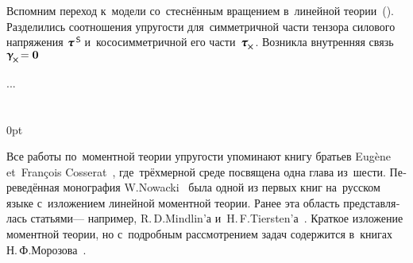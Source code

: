 

\label{section:caseoflatenttrihedron.largedisplacementsandrotations}

\begin{otherlanguage}{russian}

Вспомним переход к~модели со~стеснённым вращением в~линейной теории~().
Разделились соотношения упругости для~симметричной части тензора силового напряжения ${\forcestresstensor^{\hspace{.32ex}\mathsf{S}}}\hspace{-0.2ex}$ и~кососимметричной его части~${\forcestresstensor_{\hspace{-0.1ex}\Xcompanion}}$.
Возникла внутренняя связь~${\distortiontensor_{\hspace{-0.25ex}\Xcompanion} \hspace{-0.32ex} = \zerovector}$

...




\end{otherlanguage}

\section*{\small \wordforbibliography}

\begin{changemargin}{\parindent}{0pt}
\fontsize{10}{12}\selectfont

\begin{otherlanguage}{russian}

Все работы по~моментной теории упругости упоминают книгу братьев Eugène et~François Cosserat~\cite{cosserat}, где~трёх\-мерной среде посвящена одна глава из~шести.
Переведённая монография \hbox{W\hspace{-0.2ex}.\:Nowacki}~\cite{nowacki-elasticity} была одной из первых книг на~русском языке с~изложением линейной моментной теории.
Ранее эта область представлялась статьями\:--- например, R.\,D.\:Mindlin’а и~H.\,F.\:Tiersten’а~\cite{mindlin.tiersten}.
Краткое изложение моментной теории, но с~подробным рассмотрением задач содержится в~книгах Н.\,Ф.\:Морозова~\cite{morozov-twodimensionalproblems, morozov-fractures}.

\end{otherlanguage}

\end{changemargin}
